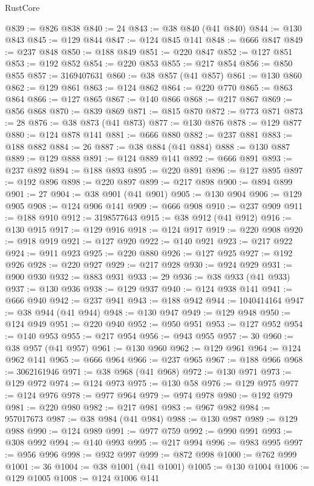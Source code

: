 \begin{lexlean}{RustCore}
\begin{coremodule}
@839 := @826 @838
@840 := 24
@843 := @38 @840 (@41 @840)
@844 := @130 @843
@845 := @129 @844
@847 := @124 @845 @141
@848 := @666 @847
@849 := @237 @848
@850 := @188 @849
@851 := @220 @847
@852 := @127 @851
@853 := @192 @852
@854 := @220 @853
@855 := @217 @854
@856 := @850 @855
@857 := 3169407631
@860 := @38 @857 (@41 @857)
@861 := @130 @860
@862 := @129 @861
@863 := @124 @862
@864 := @220 @770
@865 := @863 @864
@866 := @127 @865
@867 := @140 @866
@868 := @217 @867
@869 := @856 @868
@870 := @839 @869
@871 := @815 @870
@872 := @773 @871
@873 := 28
@876 := @38 @873 (@41 @873)
@877 := @130 @876
@878 := @129 @877
@880 := @124 @878 @141
@881 := @666 @880
@882 := @237 @881
@883 := @188 @882
@884 := 26
@887 := @38 @884 (@41 @884)
@888 := @130 @887
@889 := @129 @888
@891 := @124 @889 @141
@892 := @666 @891
@893 := @237 @892
@894 := @188 @893
@895 := @220 @891
@896 := @127 @895
@897 := @192 @896
@898 := @220 @897
@899 := @217 @898
@900 := @894 @899
@901 := 27
@904 := @38 @901 (@41 @901)
@905 := @130 @904
@906 := @129 @905
@908 := @124 @906 @141
@909 := @666 @908
@910 := @237 @909
@911 := @188 @910
@912 := 3198577643
@915 := @38 @912 (@41 @912)
@916 := @130 @915
@917 := @129 @916
@918 := @124 @917
@919 := @220 @908
@920 := @918 @919
@921 := @127 @920
@922 := @140 @921
@923 := @217 @922
@924 := @911 @923
@925 := @220 @880
@926 := @127 @925
@927 := @192 @926
@928 := @220 @927
@929 := @217 @928
@930 := @924 @929
@931 := @900 @930
@932 := @883 @931
@933 := 29
@936 := @38 @933 (@41 @933)
@937 := @130 @936
@938 := @129 @937
@940 := @124 @938 @141
@941 := @666 @940
@942 := @237 @941
@943 := @188 @942
@944 := 1040414164
@947 := @38 @944 (@41 @944)
@948 := @130 @947
@949 := @129 @948
@950 := @124 @949
@951 := @220 @940
@952 := @950 @951
@953 := @127 @952
@954 := @140 @953
@955 := @217 @954
@956 := @943 @955
@957 := 30
@960 := @38 @957 (@41 @957)
@961 := @130 @960
@962 := @129 @961
@964 := @124 @962 @141
@965 := @666 @964
@966 := @237 @965
@967 := @188 @966
@968 := 3062161946
@971 := @38 @968 (@41 @968)
@972 := @130 @971
@973 := @129 @972
@974 := @124 @973
@975 := @130 @58
@976 := @129 @975
@977 := @124 @976
@978 := @977 @964
@979 := @974 @978
@980 := @192 @979
@981 := @220 @980
@982 := @217 @981
@983 := @967 @982
@984 := 957017673
@987 := @38 @984 (@41 @984)
@988 := @130 @987
@989 := @129 @988
@990 := @124 @989
@991 := @977 @759
@992 := @990 @991
@993 := @308 @992
@994 := @140 @993
@995 := @217 @994
@996 := @983 @995
@997 := @956 @996
@998 := @932 @997
@999 := @872 @998
@1000 := @762 @999
@1001 := 36
@1004 := @38 @1001 (@41 @1001)
@1005 := @130 @1004
@1006 := @129 @1005
@1008 := @124 @1006 @141

\end{coremodule}
\end{lexlean}

